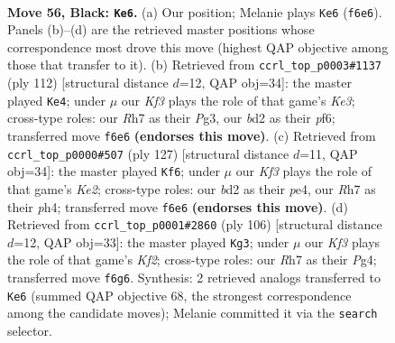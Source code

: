 \documentclass[11pt]{article}
\begin{document}
\clearpage

\begin{figure}[p]\centering
\begin{subfigure}{0.46\textwidth}\centering
\resizebox{\linewidth}{!}{%
\newchessgame
\chessboard[
  setfen={5R2/7r/3P1k2/1p6/4K3/r7/1p1B4/8 b - - 1 56},
  showmover=false,
  pgfstyle=straightmove, color=movearrow, markmove={f6-e6}
]}
\caption{}
\end{subfigure}\hfill
\begin{subfigure}{0.46\textwidth}\centering
\resizebox{\linewidth}{!}{%
\newchessgame
\chessboard[
  setfen={6R1/8/5p1k/5P2/6p1/r3K1P1/8/8 w - - 23 57},
  showmover=false,
  pgfstyle=straightmove, color=movearrow, markmove={e3-e4}
]}
\caption{}
\end{subfigure}
\\[4pt]
\begin{subfigure}{0.46\textwidth}\centering
\resizebox{\linewidth}{!}{%
\newchessgame
\chessboard[
  setfen={1r6/R3k1p1/8/4p2p/2K1P2P/8/8/8 b - - 3 64},
  showmover=false,
  pgfstyle=straightmove, color=movearrow, markmove={e7-f6}
]}
\caption{}
\end{subfigure}\hfill
\begin{subfigure}{0.46\textwidth}\centering
\resizebox{\linewidth}{!}{%
\newchessgame
\chessboard[
  setfen={5k2/R7/6p1/8/5PP1/8/1r3K2/8 w - - 3 54},
  showmover=false,
  pgfstyle=straightmove, color=movearrow, markmove={f2-g3}
]}
\caption{}
\end{subfigure}
\caption{\textbf{Move 56, Black: \texttt{Ke6}.} (a) Our position; Melanie plays \texttt{Ke6} (\texttt{f6e6}). Panels (b)--(d) are the retrieved master positions whose correspondence most drove this move (highest QAP objective among those that transfer to it). (b) Retrieved from \texttt{ccrl\_top\_p0003\#1137} (ply 112) [structural distance $d$=12, QAP obj=34]: the master played \texttt{Ke4}; under $\mu$ our \emph{Kf3} plays the role of that game's \emph{Ke3}; cross-type roles: our \emph{R}h7 as their \emph{P}g3, our \emph{b}d2 as their \emph{p}f6; transferred move \texttt{f6e6} \textbf{(endorses this move)}. (c) Retrieved from \texttt{ccrl\_top\_p0000\#507} (ply 127) [structural distance $d$=11, QAP obj=34]: the master played \texttt{Kf6}; under $\mu$ our \emph{Kf3} plays the role of that game's \emph{Ke2}; cross-type roles: our \emph{b}d2 as their \emph{p}e4, our \emph{R}h7 as their \emph{p}h4; transferred move \texttt{f6e6} \textbf{(endorses this move)}. (d) Retrieved from \texttt{ccrl\_top\_p0001\#2860} (ply 106) [structural distance $d$=12, QAP obj=33]: the master played \texttt{Kg3}; under $\mu$ our \emph{Kf3} plays the role of that game's \emph{Kf2}; cross-type roles: our \emph{R}h7 as their \emph{P}g4; transferred move \texttt{f6g6}. Synthesis: 2 retrieved analogs transferred to \texttt{Ke6} (summed QAP objective 68, the strongest correspondence among the candidate moves); Melanie committed it via the \texttt{search} selector.}
\label{fig:thought-m111}
\end{figure}
\end{document}
